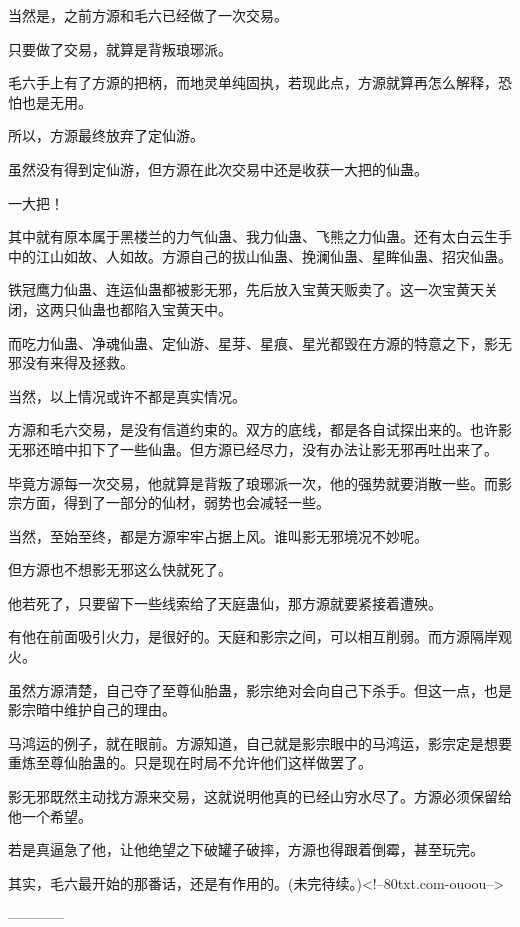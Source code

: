 \begin{this_body}
当然是，之前方源和毛六已经做了一次交易。

只要做了交易，就算是背叛琅琊派。

毛六手上有了方源的把柄，而地灵单纯固执，若现此点，方源就算再怎么解释，恐怕也是无用。

所以，方源最终放弃了定仙游。

虽然没有得到定仙游，但方源在此次交易中还是收获一大把的仙蛊。

一大把！

其中就有原本属于黑楼兰的力气仙蛊、我力仙蛊、飞熊之力仙蛊。还有太白云生手中的江山如故、人如故。方源自己的拔山仙蛊、挽澜仙蛊、星眸仙蛊、招灾仙蛊。

铁冠鹰力仙蛊、连运仙蛊都被影无邪，先后放入宝黄天贩卖了。这一次宝黄天关闭，这两只仙蛊也都陷入宝黄天中。

而吃力仙蛊、净魂仙蛊、定仙游、星芽、星痕、星光都毁在方源的特意之下，影无邪没有来得及拯救。

当然，以上情况或许不都是真实情况。

方源和毛六交易，是没有信道约束的。双方的底线，都是各自试探出来的。也许影无邪还暗中扣下了一些仙蛊。但方源已经尽力，没有办法让影无邪再吐出来了。

毕竟方源每一次交易，他就算是背叛了琅琊派一次，他的强势就要消散一些。而影宗方面，得到了一部分的仙材，弱势也会减轻一些。

当然，至始至终，都是方源牢牢占据上风。谁叫影无邪境况不妙呢。

但方源也不想影无邪这么快就死了。

他若死了，只要留下一些线索给了天庭蛊仙，那方源就要紧接着遭殃。

有他在前面吸引火力，是很好的。天庭和影宗之间，可以相互削弱。而方源隔岸观火。

虽然方源清楚，自己夺了至尊仙胎蛊，影宗绝对会向自己下杀手。但这一点，也是影宗暗中维护自己的理由。

马鸿运的例子，就在眼前。方源知道，自己就是影宗眼中的马鸿运，影宗定是想要重炼至尊仙胎蛊的。只是现在时局不允许他们这样做罢了。

影无邪既然主动找方源来交易，这就说明他真的已经山穷水尽了。方源必须保留给他一个希望。

若是真逼急了他，让他绝望之下破罐子破摔，方源也得跟着倒霉，甚至玩完。

其实，毛六最开始的那番话，还是有作用的。(未完待续。)<!--80txt.com-ouoou-->

------------

\end{this_body}

